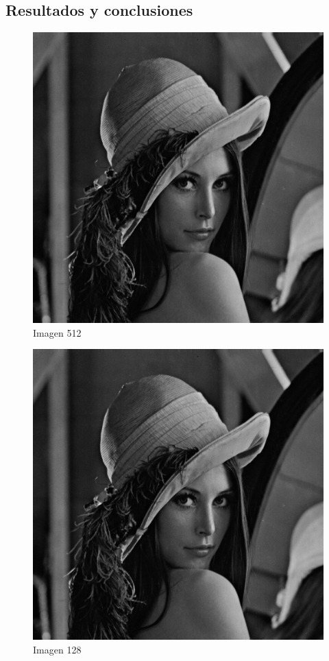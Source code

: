 \documentclass{article}
\begin{document}
\begin{multicols}{2}
\section{Resultados y conclusiones}
\label{sec4}

\begin{figure}[H]
\centering
\includegraphics[scale=0.2]{../img/lena512.png}
\caption{Imagen 512}
\label{Imagen 512}
\end{figure}

\begin{figure}[H]
\centering
\includegraphics[scale=0.2]{../img/lena512.png}
\caption{Imagen 128}
\label{Imagen 128}
\end{figure}


\end{multicols}
\end{document}
